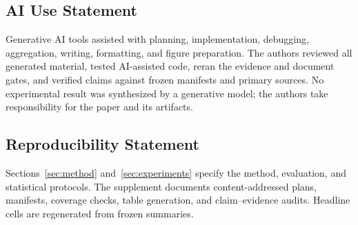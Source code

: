 \subsection*{AI Use Statement}
\label{sec:ai-use-statement}

Generative AI tools assisted with planning, implementation, debugging, aggregation, writing, formatting, and figure preparation. The authors reviewed all generated material, tested AI-assisted code, reran the evidence and document gates, and verified claims against frozen manifests and primary sources. No experimental result was synthesized by a generative model; the authors take responsibility for the paper and its artifacts.

\subsection*{Reproducibility Statement}
\label{sec:reproducibility-statement}

Sections~\ref{sec:method} and~\ref{sec:experiments} specify the method, evaluation, and statistical protocols. The supplement documents content-addressed plans, manifests, coverage checks, table generation, and claim--evidence audits. Headline cells are regenerated from frozen summaries.

